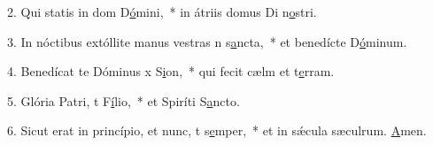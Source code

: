 2. Qui statis in dom D\uline{ó}mini,~* in átriis domus Di n\uline{o}stri.\par 
3. In nóctibus extóllite manus vestras n s\uline{a}ncta,~* et benedícte D\uline{ó}minum.\par 
4. Benedícat te Dóminus x S\uline{i}on,~* qui fecit cælm et t\uline{e}rram.\par 
5. Glória Patri, t F\uline{í}lio,~* et Spiríti S\uline{a}ncto.\par 
6. Sicut erat in princípio, et nunc, t s\uline{e}mper,~* et in sǽcula sæculrum. \uline{A}men.\par 
